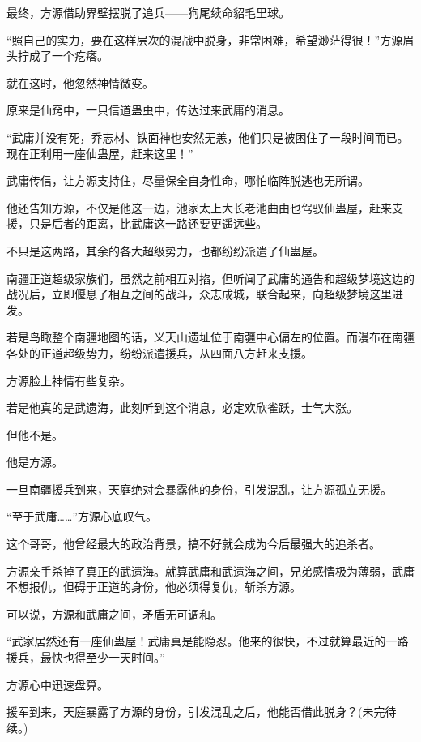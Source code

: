 \begin{this_body}
最终，方源借助界壁摆脱了追兵——狗尾续命貂毛里球。

“照自己的实力，要在这样层次的混战中脱身，非常困难，希望渺茫得很！”方源眉头拧成了一个疙瘩。

就在这时，他忽然神情微变。

原来是仙窍中，一只信道蛊虫中，传达过来武庸的消息。

“武庸并没有死，乔志材、铁面神也安然无恙，他们只是被困住了一段时间而已。现在正利用一座仙蛊屋，赶来这里！”

武庸传信，让方源支持住，尽量保全自身性命，哪怕临阵脱逃也无所谓。

他还告知方源，不仅是他这一边，池家太上大长老池曲由也驾驭仙蛊屋，赶来支援，只是后者的距离，比武庸这一路还要更遥远些。

不只是这两路，其余的各大超级势力，也都纷纷派遣了仙蛊屋。

南疆正道超级家族们，虽然之前相互对掐，但听闻了武庸的通告和超级梦境这边的战况后，立即偃息了相互之间的战斗，众志成城，联合起来，向超级梦境这里进发。

若是鸟瞰整个南疆地图的话，义天山遗址位于南疆中心偏左的位置。而漫布在南疆各处的正道超级势力，纷纷派遣援兵，从四面八方赶来支援。

方源脸上神情有些复杂。

若是他真的是武遗海，此刻听到这个消息，必定欢欣雀跃，士气大涨。

但他不是。

他是方源。

一旦南疆援兵到来，天庭绝对会暴露他的身份，引发混乱，让方源孤立无援。

“至于武庸……”方源心底叹气。

这个哥哥，他曾经最大的政治背景，搞不好就会成为今后最强大的追杀者。

方源亲手杀掉了真正的武遗海。就算武庸和武遗海之间，兄弟感情极为薄弱，武庸不想报仇，但碍于正道的身份，他必须得复仇，斩杀方源。

可以说，方源和武庸之间，矛盾无可调和。

“武家居然还有一座仙蛊屋！武庸真是能隐忍。他来的很快，不过就算最近的一路援兵，最快也得至少一天时间。”

方源心中迅速盘算。

援军到来，天庭暴露了方源的身份，引发混乱之后，他能否借此脱身？(未完待续。)

\end{this_body}

